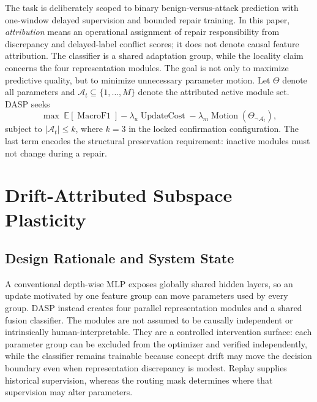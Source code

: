\documentclass{ieeeaccess}
\begin{document}
The task is deliberately scoped to binary benign-versus-attack prediction with one-window delayed supervision and bounded repair training. In this paper, \emph{attribution} means an operational assignment of repair responsibility from discrepancy and delayed-label conflict scores; it does not denote causal feature attribution. The classifier is a shared adaptation group, while the locality claim concerns the four representation modules. The goal is not only to maximize predictive quality, but to minimize unnecessary parameter motion. Let $\Theta$ denote all parameters and $\mathcal{A}_t\subseteq\{1,\ldots,M\}$ denote the attributed active module set. DASP seeks
\begin{equation}
\max \; \mathbb{E}[\operatorname{MacroF1}] - \lambda_u \operatorname{UpdateCost} - \lambda_m \operatorname{Motion}(\Theta_{\neg\mathcal{A}_t}),
\label{eq:objective}
\end{equation}
subject to $|\mathcal{A}_t|\leq k$, where $k=3$ in the locked confirmation configuration. The last term encodes the structural preservation requirement: inactive modules must not change during a repair.

\section{Drift-Attributed Subspace Plasticity}
\label{sec:method}

\subsection{Design Rationale and System State}
A conventional depth-wise MLP exposes globally shared hidden layers, so an update motivated by one feature group can move parameters used by every group. DASP instead creates four parallel representation modules and a shared fusion classifier. The modules are not assumed to be causally independent or intrinsically human-interpretable. They are a controlled intervention surface: each parameter group can be excluded from the optimizer and verified independently, while the classifier remains trainable because concept drift may move the decision boundary even when representation discrepancy is modest. Replay supplies historical supervision, whereas the routing mask determines where that supervision may alter parameters.
\end{document}
